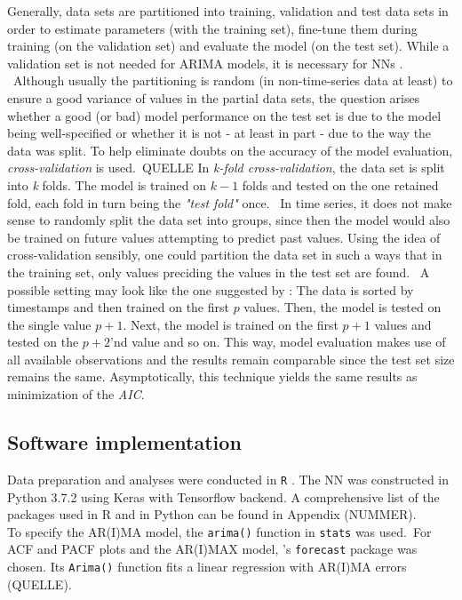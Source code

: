 \documentclass[a4paper, 11pt]{article}
\begin{document}
Generally, data sets are partitioned into training, validation and test data sets in order to estimate parameters (with the training set), fine-tune them during training (on the validation set) and evaluate the model (on the test set). While a validation set is not needed for ARIMA models, it is necessary for NNs \citep{Zhou.2006}. \
Although usually the partitioning is random (in non-time-series data at least) to ensure a good variance of values in the partial data sets, the question arises whether a good (or bad) model performance on the test set is due to the model being well-specified or whether it is not - at least in part - due to the way the data was split. To help eliminate doubts on the accuracy of the model evaluation,  \textit{cross-validation} is used.\ QUELLE
In \textit{k-fold cross-validation}, the data set is split into \textit{k} folds. The model is trained on $k-1$ folds and tested on the one retained fold, each fold in turn being the \textit{"test fold"} once. \
In time series, it does not make sense to randomly split the data set into groups, since then the model would also be trained on future values attempting to predict past values. Using the idea of cross-validation sensibly, one could partition the data set in such a ways that in the training set, only values preciding the values in the test set are found. \
A possible setting may look like the one suggested by \cite{Hyndman.2018}: The data is sorted by timestamps and then trained on the first $p$ values. Then, the model is tested on the single value $p+1$. Next, the model is trained on the first $p+1$ values and tested on the $p+2$'nd value and so on. This way, model evaluation makes use of all available observations and the results remain comparable since the test set size remains the same. Asymptotically, this technique yields the same results as minimization of the \textit{AIC}.

\subsection{Software implementation}

Data preparation and analyses were conducted in \texttt{R} \citep{Team.2013}. The NN was constructed in Python 3.7.2 using Keras \citep{chollet2015keras} with Tensorflow \citep{tensorflow2015-whitepaper} backend. A comprehensive list of the packages used in R and in Python can be found in Appendix (NUMMER).\\


To specify the AR(I)MA model, the \texttt{arima()} function in \texttt{stats{}} was used.\
For ACF and PACF plots and the AR(I)MAX model, \cite{Hyndman.2008}'s  \texttt{forecast} package was chosen. Its \texttt{Arima()} function fits a linear regression with AR(I)MA errors (QUELLE).\\
\end{document}
